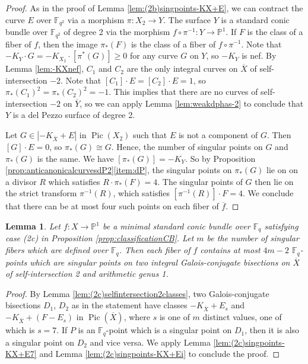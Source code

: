 \documentclass[a4paper, 11pt, reqno]{amsart}
\numberwithin{equation}{section} \numberwithin{figure}{section}
\DeclareMathOperator{\Pic}{Pic}
\def \F {{\mathbb F}}
\def \P {{\mathbb P}}
\newcommand{\ra}{\rightarrow}
\newtheorem{lemma}{Lemma}
\theoremstyle{definition}
\numberwithin{lemma}{section}
\begin{document}
\begin{proof}
    As in the proof of Lemma \ref{lem:(2b)singpoints-KX+E}, we can contract the curve $E$ over $\F_{q^2}$ via a morphism $\pi \colon X_2 \ra Y$. The surface $Y$ is a standard conic bundle over $\F_{q^2}$ of degree 2 via the morphism $f \circ \pi^{-1} \colon Y \ra \P^1$. If $F$ is the class of a fiber of $f$, then the image $\pi_*(F)$ is the class of a fiber of $f \circ \pi^{-1}$. Note that $-K_Y \cdot G = -K_{X_2} \cdot [\pi^*(G)] \geq 0$ for any curve $G$ on $Y$, so $-K_Y$ is nef. By Lemma \ref{lem:-KXnef}, $C_1$ and $C_2$ are the only integral curves on $\overline{X}$ of self-intersection $-2$. Note that $[C_1] \cdot E = [C_2] \cdot E = 1$, so $\pi_*(C_1)^2= \pi_*(C_2)^2 = -1$. This implies that there are no curves of self-intersection $-2$ on $\overline{Y}$, so we can apply Lemma \ref{lem:weakdphas-2} to conclude that $Y$ is a del Pezzo surface of degree 2. 
    
    Let $G \in |-K_{\overline{X}} + E|$ in $\Pic(X_{2})$ such that $E$ is not a component of $G$. Then $[G] \cdot E = 0$, so $\pi_*(G) \cong G$. Hence, the number of singular points on $G$ and $\pi_*(G)$ is the same. We have $[\pi_*(G)] = -K_Y$. So by Proposition \ref{prop:anticanonicalcurvesdP2}\ref{item:dP}, the singular points on $\pi_*(G)$ lie on on a divisor $R$ which satisfies $R \cdot \pi_*(F) = 4$. The singular points of $G$ then lie on the strict transform $\pi^{-1}(R)$, which satisfies $[\pi^{-1}(R)] \cdot F = 4$. We conclude that there can be at most four such points on each fiber of $\overline{f}$.
\end{proof}

\begin{lemma}\label{lem:(2c)singpointsintersection2}
    Let $f \colon X \ra \P^1$ be a minimal standard conic bundle over $\F_q$ satisfying case (2c) in Proposition \ref{prop:classificationCB}. Let $m$ be the number of singular fibers which are defined over $\F_q$. Then each fiber of $f$ contains at most $4m-2$ $\F_q$-points which are singular points on two integral Galois-conjugate bisections on $\overline{X}$ of self-intersection 2 and arithmetic genus 1.
\end{lemma}

\begin{proof}
    By Lemma \ref{lem:(2c)selfintersection2classes}, two Galois-conjugate bisections $D_1$, $D_2$ as in the statement have classes $-K_{\overline{X}} + E_s$ and $-K_{\overline{X}} + (F - E_s)$ in $\Pic(\overline{X})$, where $s$ is one of $m$ distinct values, one of which is $s = 7$. If $P$ is an $\F_q$-point which is a singular point on $D_1$, then it is also a singular point on $D_2$ and vice versa. We apply Lemma \ref{lem:(2c)singpoints-KX+E7} and Lemma \ref{lem:(2c)singpoints-KX+Ei} to conclude the proof.
\end{proof}
\end{document}
